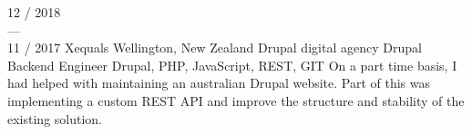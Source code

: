 \documentclass[]{friggeri-cv} %
\begin{document}
\begin{entrylist}
{  %
  }
  \job
  {12 / 2018 \\ --- \\ 11 / 2017}
  {Xequals}
  {Wellington, New Zealand}
  {Drupal digital agency}
  {
    \position
      {Drupal Backend Engineer}
      {Drupal, PHP, JavaScript, REST, GIT}
      {
        On a part time basis, I had helped with maintaining an australian Drupal website. Part of this
        was implementing a custom REST API and improve the structure and stability of the existing solution.
      }
  }
\end{entrylist}
\end{document}
